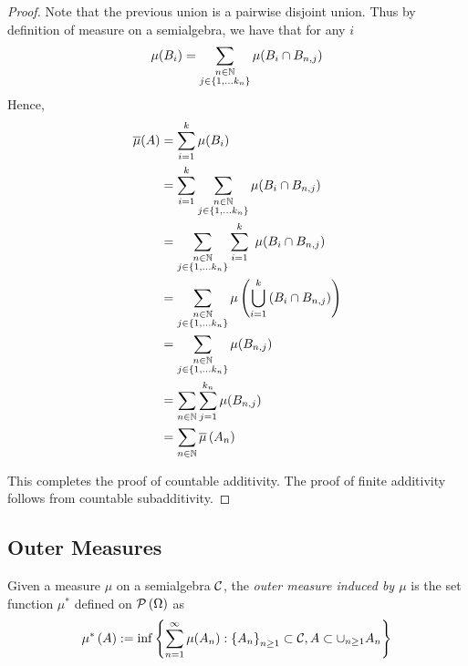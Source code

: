 \begin{proof}
    Note that the previous union is a pairwise disjoint union. Thus by definition of measure on a semialgebra, we have that for any $i$
    \begin{equation*}
	\mu (B_i) =\sum_{\substack{n\in \mathbb N \\ j\in \left\{ 1, \ldots k_n \right\}}} \mu (B_i \cap B_{n,j}) 
    \end{equation*}
    Hence, 
    \begin{align*}
	\overline \mu (A) &= \sum_{i=1}^{k} \mu (B_i ) \\
	&= \sum_{i=1}^{k} \sum_{\substack{n\in \mathbb N \\ j\in \left\{ 1, \ldots k_n \right\}}} \mu (B_i \cap B_{n,j}) \\
&= \sum_{\substack{n\in \mathbb N \\ j\in \left\{ 1, \ldots k_n \right\}}}\sum_{i=1}^{k} \ \mu (B_i \cap B_{n,j}) \\
&= \sum_{\substack{n\in \mathbb N \\ j\in \left\{ 1, \ldots k_n \right\}}} \mu \left( \bigcup_{i=1}^k \left( B_i \cap B_{n,j} \right) \right) \\
&= \sum_{\substack{n\in \mathbb N \\ j\in \left\{ 1, \ldots k_n \right\}}} \mu (B_{n,j}) \\
&= \sum_{n\in \mathbb N} \sum_{j=1}^{k_n} \mu (B_{n,j}) \\
&= \sum_{n\in \mathbb N} \overline \mu \left( A_n \right)
    \end{align*}
    
This completes the proof of countable additivity. The proof of finite additivity follows from countable subadditivity.
\end{proof}

\subsection{Outer Measures}

\begin{definition}
    Given a measure $\mu$ on a semialgebra ${\cal C}$, the \textit{outer measure induced by $\mu$} is the set function $\mu ^{*}$ defined on ${\cal P} \left( \Omega \right)$ as
    \begin{equation*}
	\mu ^{*} \left( A \right) := \inf \left\{ \sum_{n=1}^{\infty} \mu (A_n) : \left\{ A_n \right\} _{n\ge 1} \subset {\cal C} , A \subset \cup_{n \ge 1} A_n \right\}
	\label{eqn:outer-measure}
    \end{equation*}
    \label{def:outer-measure}
\end{definition}

